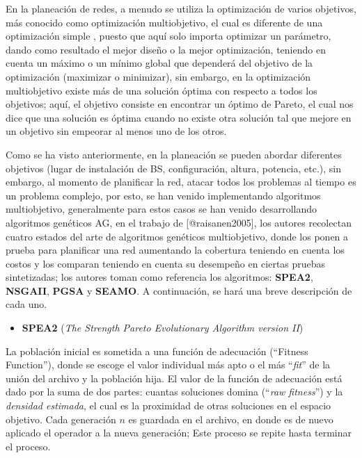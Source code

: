 \documentclass[]{article}
\providecommand{\tightlist}{%
  \setlength{\itemsep}{0pt}\setlength{\parskip}{0pt}}
\begin{document}
En la planeación de redes, a menudo se utiliza la optimización de varios
objetivos, más conocido como optimización multiobjetivo, el cual es
diferente de una optimización simple , puesto que aquí solo importa
optimizar un parámetro, dando como resultado el mejor diseño o la mejor
optimización, teniendo en cuenta un máximo o un mínimo global que
dependerá del objetivo de la optimización (maximizar o minimizar), sin
embargo, en la optimización multiobjetivo existe más de una solución
óptima con respecto a todos los objetivos; aquí, el objetivo consiste en
encontrar un óptimo de Pareto, el cual nos dice que una solución es
óptima cuando no existe otra solución tal que mejore en un objetivo sin
empeorar al menos uno de los otros.

Como se ha visto anteriormente, en la planeación se pueden abordar
diferentes objetivos (lugar de instalación de BS, configuración, altura,
potencia, etc.), sin embargo, al momento de planificar la red, atacar
todos los problemas al tiempo es un problema complejo, por esto, se han
venido implementando algoritmos multiobjetivo, generalmente para estos
casos se han venido desarrollando algoritmos genéticos AG, en el trabajo
de {[}@raisanen2005{]}, los autores recolectan cuatro estados del arte
de algoritmos genéticos multiobjetivo, donde los ponen a prueba para
planificar una red aumentando la cobertura teniendo en cuenta los costos
y los comparan teniendo en cuenta su desempeño en ciertas pruebas
sintetizadas; los autores toman como referencia los algoritmos:
\textbf{SPEA2}, \textbf{NSGAII}, \textbf{PGSA} y \textbf{SEAMO}. A
continuación, se hará una breve descripción de cada uno.

\begin{itemize}
\tightlist
\item
  \textbf{SPEA2} (\emph{The Strength Pareto Evolutionary Algorithm
  version II})
\end{itemize}

La población inicial es sometida a una función de adecuación (``Fitness
Function''), donde se escoge el valor individual más apto o el más
``\emph{fit}'' de la unión del archivo y la población hija. El valor de
la función de adecuación está dado por la suma de dos partes: cuantas
soluciones domina (``\emph{raw fitness}'') y la \emph{densidad
estimada}, el cual es la proximidad de otras soluciones en el espacio
objetivo. Cada generación \(n\) es guardada en el archivo, en donde es
de nuevo aplicado el operador a la nueva generación; Este proceso se
repite hasta terminar el proceso.
\end{document}
